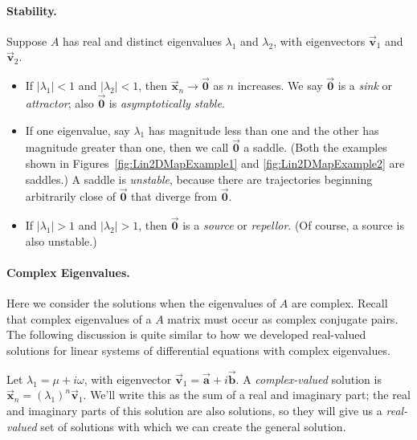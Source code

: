 \documentclass{book}
\newcommand{\BA}{\vec{\textbf{a}}}
\newcommand{\BB}{\vec{\textbf{b}}}
\newcommand{\BV}{\vec{\textbf{v}}}
\newcommand{\BX}{\vec{\textbf{x}}}
\newcommand{\BZ}{\vec{\textbf{0}}}  %
\begin{document}
\paragraph{Stability.}
Suppose $A$ has real and distinct eigenvalues
$\lambda_1$ and $\lambda_2$, with eigenvectors
$\BV_1$ and $\BV_2$.
\begin{itemize}
\item If $|\lambda_1|<1$ and $|\lambda_2|<1$, then
$\BX_n\rightarrow\BZ$ as $n$ increases.  We say
$\BZ$ is a \emph{sink} or \emph{attractor}; also
$\BZ$ is \emph{asymptotically stable}.
\item If one eigenvalue, say $\lambda_1$ has magnitude less than
one and the other has magnitude greater than one, then
we call $\BZ$ a saddle.  (Both the examples shown in
Figures~\ref{fig:Lin2DMapExample1} and \ref{fig:Lin2DMapExample2}
are saddles.) A saddle is \emph{unstable}, because there
are trajectories beginning arbitrarily close of $\BZ$ that
diverge from $\BZ$.
\item If $|\lambda_1|>1$ and $|\lambda_2|>1$, then
$\BZ$ is a \emph{source} or \emph{repellor}.  (Of course,
a source is also unstable.)
\end{itemize}
%
%
\paragraph{Complex Eigenvalues.}
Here we consider the solutions when the eigenvalues of
$A$ are complex.  Recall that complex eigenvalues of a $A$
matrix must occur as complex conjugate pairs.
The following discussion is quite similar to how
we developed real-valued solutions for linear systems
of differential equations with complex eigenvalues.
 
Let $\lambda_1=\mu + i\omega$,
with eigenvector $\BV_1 = \BA + i \BB$.
A \emph{complex-valued} solution is
$\BX_n = (\lambda_1)^n\BV_1$.
We'll write this as the sum of a real and imaginary part;
the real and imaginary parts of this solution are also solutions,
so they will give us a \emph{real-valued} set of solutions
with which we can create the general solution.
\end{document}
